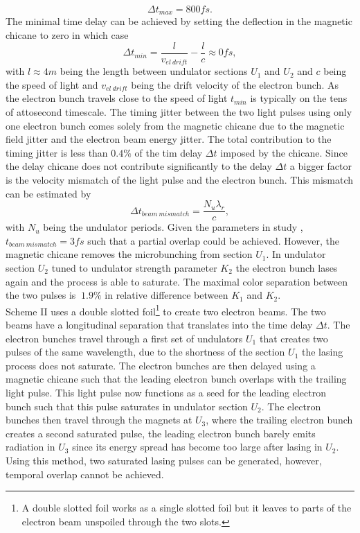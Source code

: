 \begin{equation}
\Delta t_{max} = 800 fs.
\label{eq:alberto-delta-t-max}
\end{equation} The minimal time delay can be achieved by setting the deflection in the magnetic chicane to zero in which case
\begin{equation}
\Delta t_{min} = \frac{l}{v_{el\ drift}} - \frac{l}{c}\approx 0 fs,
\label{eq:alberto-delta-t-min}
\end{equation}
with $l\approx 4m$ being the length between undulator sections $U_{1}$ and $U_{2}$ and $c$ being the speed of light and $v_{el\ drift}$ being the drift velocity of the electron bunch. As the electron bunch travels close to the speed of light $t_{min}$ is typically on the tens of attosecond timescale. The timing jitter between the two light pulses using only one electron bunch comes solely from the magnetic chicane due to the magnetic field jitter and the electron beam energy jitter. The total contribution to the timing jitter is less than $0.4\%$ of the tim delay $\Delta t$ imposed by the chicane. Since the delay chicane does not contribute significantly to the delay $\Delta t$ a bigger factor is the velocity mismatch of the light pulse and the electron bunch. This mismatch can be estimated by
\begin{equation}
\Delta t_{beam\ mismatch}=\frac{N_{u} \lambda_{r}}{c},
\label{eq:alberto-beam-missmatch}
\end{equation}
with $N_{u}$ being the undulator periods. Given the parameters in study \cite{Lutman-2013-PRL}, $t_{beam\ mismatch}=3fs$ such that a partial overlap could be achieved. However, the magnetic chicane removes the microbunching from section $U_{1}$. In undulator section $U_{2}$ tuned to undulator strength parameter $K_{2}$ the electron bunch lases again and the process is able to saturate. The maximal color separation between the two pulses is $~ 1.9\%$ in relative difference between $K_{1}$ and $K_{2}$.\\
Scheme II uses a double slotted foil\footnote{A double slotted foil works as a single slotted foil but it leaves to parts of the electron beam unspoiled through the two slots.} to create two electron beams. The two beams have a longitudinal separation that translates into the time delay $\Delta t$. The electron bunches travel through a first set of undulators $U_{1}$ that creates two pulses of the same wavelength, due to the shortness of the section $U_{1}$ the lasing process does not saturate. The electron bunches are then delayed using a magnetic chicane such that the leading electron bunch overlaps with the trailing light pulse. This light pulse now functions as a seed for the leading electron bunch such that this pulse saturates in undulator section $U_{2}$. The electron bunches then travel through the magnets at $U_{3}$, where the trailing electron bunch creates a second saturated pulse, the leading electron bunch barely emits radiation in $U_{3}$ since its energy spread has become too large after lasing in $U_{2}$. Using this method, two saturated lasing pulses can be generated, however, temporal overlap cannot be achieved.

